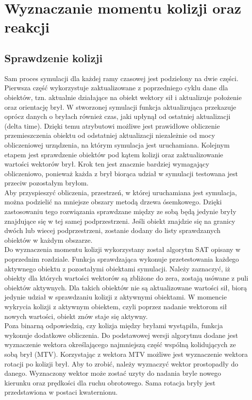 \chapter{Wyznaczanie momentu kolizji oraz reakcji}

\section{Sprawdzenie kolizji}
Sam proces symulacji dla każdej ramy czasowej jest podzielony na dwie części. Pierwsza część wykorzystuje zaktualizowane z poprzedniego cyklu dane dla obiektów, tzn. aktualnie działające na obiekt wektory sił i aktualizuje położenie oraz orientację brył. W stworzonej symulacji funkcja aktualizująca przekazuje oprócz danych o bryłach również czas, jaki upłynął od ostatniej aktualizacji (delta time). Dzięki temu atrybutowi możliwe jest prawidłowe obliczenie przemieszczenia obiektu od odstatniej aktualizacji niezależnie od mocy obliczeniowej urządzenia, na którym symulacja jest uruchamiana. Kolejnym etapem jest sprawdzenie obiektów pod kątem kolizji oraz zaktualizowanie wartości wektorów brył. Krok ten jest znacznie bardziej wymagający obliczeniowo, ponieważ każda z brył biorąca udział w symulacji testowana jest przeciw pozostałym bryłom. \\
Aby przyspieszyć obliczenia, przestrzeń, w której uruchamiana jest symulacja, można podzielić na mniejsze obszary metodą drzewa ósemkowego. Dzięki zastosowaniu tego rozwiązania sprawdzane między ze sobą będą jedynie bryły znajdujące się w tej samej podprzestrzeni. Jeśli obiekt znajdzie się na granicy dwóch lub wiecej podprzestrzeni, zostanie dodany do listy sprawdzanych obiektów w każdym obszarze.\\
Do wyznaczenia momentu kolizji wykorzystany został algorytm SAT opisany w poprzednim rozdziale. Funkcja sprawdzająca wykonuje przetestowania każdego aktywnego obiektu z pozostałymi obiektami symulacji. Należy zaznaczyć, iż obiekty dla których wartości wektorów są zbliżone do zera, zostają usówane z puli obiektów aktywnych. Dla takich obiektów nie są aktualizowane wartości sił, biorą jedynie udział w sprawdzaniu kolizji z aktywnymi obiektami. W momencie wykrycia kolizji z aktywnym obiektem, czyli poprzez nadanie wektorom sił nowych wartości, obiekt znów staje się aktywny.
\\Poza binarną odpowiedzią, czy kolizja między bryłami wystąpiła, funkcja wykonuje dodatkowe obliczenia. Do podstawowej wersji algorytmu dodane jest wyznaczenie wektora określającego najmniejszą część wspólną kolidujących ze sobą brył (MTV).
Korzystając z wektora MTV możliwe jest wyznaczenie wektora rotacji po kolizji brył. Aby to zrobić, należy wyznaczyć  wektor prostopadły do danego. Wyznaczony wektor może zostać uzyty do nadania bryle nowego kierunku oraz prędkości dla ruchu obrotowego. Sama rotacja bryły jest przedstawiona w postaci kwaternionu.\\

